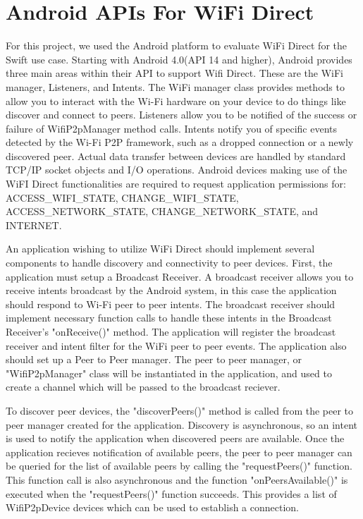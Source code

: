 \documentclass[10pt,twocolumn]{article}
\begin{document}
\section{Android APIs For WiFi Direct}
For this project, we used the Android platform to evaluate WiFi Direct for the Swift use case.
Starting with Android 4.0(API 14 and higher), Android provides three main areas within their API to support Wifi Direct.
These are the WiFi manager, Listeners, and Intents.
The WiFi manager class provides methods to allow you to interact with the Wi-Fi hardware on your device to do things like discover and connect to peers. 
Listeners allow you to be notified of the success or failure of WifiP2pManager method calls. 
Intents notify you of specific events detected by the Wi-Fi P2P framework, such as a dropped connection or a newly discovered peer. 
Actual data transfer between devices are handled by standard TCP/IP socket objects and I/O operations.
Android devices making use of the WiFI Direct functionalities are required to request application permissions for: ACCESS\_WIFI\_STATE, CHANGE\_WIFI\_STATE, ACCESS\_NETWORK\_STATE, CHANGE\_NETWORK\_STATE, and INTERNET. \cite{androidoverview}

An application wishing to utilize WiFi Direct should implement several components to handle discovery and connectivity to peer devices.
First, the application must setup a Broadcast Receiver. 
A broadcast receiver allows you to receive intents broadcast by the Android system, in this case the application should respond to Wi-Fi peer to peer intents.
The broadcast receiver should implement necessary function calls to handle these intents in the Broadcast Receiver's "onReceive()" method.
The application will register the broadcast receiver and intent filter for the WiFi peer to peer events.
The application also should set up a Peer to Peer manager. 
The peer to peer manager, or "WifiP2pManager" class will be instantiated in the application, and used to create a channel which will be passed to the broadcast reciever.

To discover peer devices, the "discoverPeers()" method is called from the peer to peer manager created for the application.
Discovery is asynchronous, so an intent is used to notify the application when discovered peers are available.
Once the application recieves notification of available peers, the peer to peer manager can be queried for the list of available peers by calling the "requestPeers()" function. 
This function call is also asynchronous and the function "onPeersAvailable()" is executed when the "requestPeers()" function succeeds. 
This provides a list of WifiP2pDevice devices which can be used to establish a connection. \cite{androidp2p}
\end{document}
